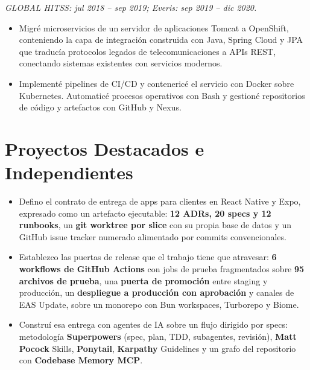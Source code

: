 {
\textit{GLOBAL HITSS: jul 2018 -- sep 2019; Everis: sep 2019 -- dic 2020.}\par\vspace{3pt}
\begin{itemize}
    \item Migré microservicios de un servidor de aplicaciones Tomcat a OpenShift, conteniendo la capa de integración construida con Java, Spring Cloud y JPA que traducía protocolos legados de telecomunicaciones a APIs REST, conectando sistemas existentes con servicios modernos.
    \item Implementé pipelines de CI/CD y contenericé el servicio con Docker sobre Kubernetes. Automaticé procesos operativos con Bash y gestioné repositorios de código y artefactos con GitHub y Nexus.
\end{itemize}

\section*{Proyectos Destacados e Independientes}

\begin{itemize}
    \item Defino el contrato de entrega de apps para clientes en React Native y Expo, expresado como un artefacto ejecutable: \textbf{12 ADRs, 20 specs y 12 runbooks}, un \textbf{git worktree por slice} con su propia base de datos y un GitHub issue tracker numerado alimentado por commits convencionales.
    \item Establezco las puertas de release que el trabajo tiene que atravesar: \textbf{6 workflows de GitHub Actions} con jobs de prueba fragmentados sobre \textbf{95 archivos de prueba}, una \textbf{puerta de promoción} entre staging y producción, un \textbf{despliegue a producción con aprobación} y canales de EAS Update, sobre un monorepo con Bun workspaces, Turborepo y Biome.
    \item Construí esa entrega con agentes de IA sobre un flujo dirigido por specs: metodología \textbf{Superpowers} (spec, plan, TDD, subagentes, revisión), \textbf{Matt Pocock} Skills, \textbf{Ponytail}, \textbf{Karpathy} Guidelines y un grafo del repositorio con \textbf{Codebase Memory MCP}.
\end{itemize}

}

